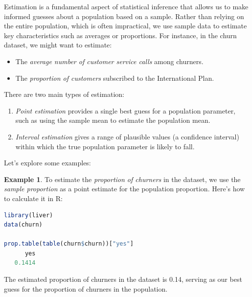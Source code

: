 \documentclass[
  11pt,
]{book}
\providecommand{\tightlist}{%
  \setlength{\itemsep}{0pt}\setlength{\parskip}{0pt}}
\theoremstyle{definition}
\theoremstyle{definition}
\newtheorem{example}{Example}[chapter]
\theoremstyle{definition}
\theoremstyle{definition}
\theoremstyle{remark}
\begin{document}
Estimation is a fundamental aspect of statistical inference that allows us to make informed guesses about a population based on a sample. Rather than relying on the entire population, which is often impractical, we use sample data to estimate key characteristics such as averages or proportions. For instance, in the churn dataset, we might want to estimate:

\begin{itemize}
\tightlist
\item
  The \emph{average number of customer service calls} among churners.\\
\item
  The \emph{proportion of customers} subscribed to the International Plan.
\end{itemize}

There are two main types of estimation:

\begin{enumerate}
\def\labelenumi{\arabic{enumi}.}
\tightlist
\item
  \emph{Point estimation} provides a single best guess for a population parameter, such as using the sample mean to estimate the population mean.\\
\item
  \emph{Interval estimation} gives a range of plausible values (a confidence interval) within which the true population parameter is likely to fall.
\end{enumerate}

Let's explore some examples:

\begin{example}
\protect\hypertarget{exm:ex-est-churn-proportion}{}\label{exm:ex-est-churn-proportion}To estimate the \emph{proportion of churners} in the dataset, we use the \emph{sample proportion} as a point estimate for the population proportion. Here's how to calculate it in R:

\begin{lstlisting}[language=R]
library(liver)
data(churn) 

prop.table(table(churn$churn))["yes"]
      yes 
   0.1414
\end{lstlisting}

The estimated proportion of churners in the dataset is 0.14, serving as our best guess for the proportion of churners in the population.
\end{example}
\end{document}
